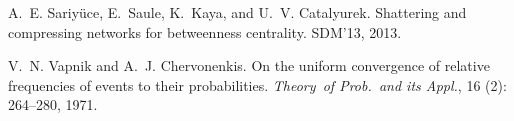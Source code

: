 \begin{thebibliography}{33}
A.~E. Sariy\"{u}ce, E.~Saule, K.~Kaya, and U.~V. Catalyurek.
\newblock Shattering and compressing networks for betweenness centrality.
\newblock SDM'13, 2013.

V.~N. Vapnik and A.~J. Chervonenkis.
\newblock On the uniform convergence of relative frequencies of events to their
  probabilities.
\newblock \emph{Theory~of Prob.~and its Appl.}, 16
  (2): 264--280, 1971.

\end{thebibliography}

